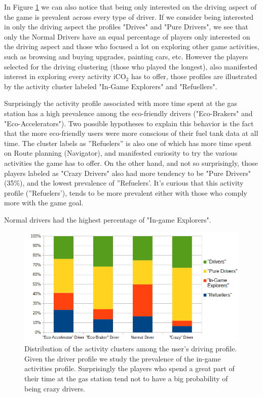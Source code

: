 \documentclass[preprint,authoryear,12pt]{elsarticle}
\begin{document}
In Figure \ref{fig:activity_driving} we can also notice that being only interested on the driving aspect of the game is prevalent across every type of driver.
If we consider being interested in only the driving aspect the profiles "Drives" and "Pure Drivers", we see that only the Normal Drivers have an equal percentage of players only interested on the driving aspect and those who focused a lot on exploring other game activities, such as browsing and buying upgrades, painting cars, etc. However the players selected for the driving clustering (those who played the longest), also manifested interest in exploring every activity iCO$_2$ has to offer, those profiles are illustrated by the activity cluster labeled "In-Game Explorers" and "Refuellers".

Surprisingly the activity profile associated with more time spent at the gas station has a high prevalence among the eco-friendly drivers ("Eco-Brakers" and "Eco-Accelerators"). Two possible hypotheses to explain this behavior is the fact that the more eco-friendly users were more conscious of their fuel tank data at all time. The cluster labels as ''Refuelers'' is also one of which has more time spent on Route planning (Navigator), and manifested curiosity to try the various activities the game has to offer. On the other hand, and not so surprisingly, those players labeled as "Crazy Drivers" also had more tendency to be "Pure Drivers" (35\%), and the lowest prevalence of ''Refuelers'. It's curious that this activity profile (''Refuelers'), tends to be more prevalent either with those who comply more with the game goal.

Normal drivers had the highest percentage of "In-game Explorers".



\begin{figure}[htb]
	\begin{center}
		\includegraphics[width=.8\linewidth]{ijhcs14-img/cluster_activities_driver_types}
		\caption{Distribution of the activity clusters among the user's driving profile. Given the driver profile we study the prevalence of the in-game activities profile. Surprisingly the players who spend a great part of their time at the gas station tend not to have a big probability of being crazy drivers. \label{fig:activity_driving}}
	\end{center}
\end{figure}
\end{document}
